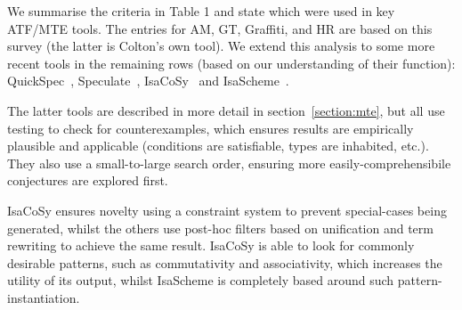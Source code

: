 %
%
%
%


We summarise the criteria in Table 1 and state which were used in key
ATF/MTE tools. The entries for AM, GT, Graffiti, \Bagai{} and HR are based
on this survey (the latter is Colton's own tool). We extend this analysis to
some more recent tools in the remaining rows (based on our understanding of
their function): QuickSpec~\cite{QuickSpec},
Speculate~\cite{braquehais2017speculate},
IsaCoSy~\cite{Johansson.Dixon.Bundy:conjecture-generation}
and IsaScheme~\cite{MontanoRivas2011}.

The latter tools are described in more detail in section~\ref{section:mte},
but all use testing to check for counterexamples, which ensures results are
empirically plausible and applicable (conditions are satisfiable, types are
inhabited, etc.). They also use a small-to-large search order, ensuring more
easily-comprehensibile conjectures are explored first.

IsaCoSy ensures novelty using a constraint system to prevent special-cases being
generated, whilst the others use post-hoc filters based on unification and term
rewriting to achieve the same result. IsaCoSy is able to look for commonly
desirable patterns, such as commutativity and associativity, which increases the
utility of its output, whilst IsaScheme is completely based around such
pattern-instantiation.

